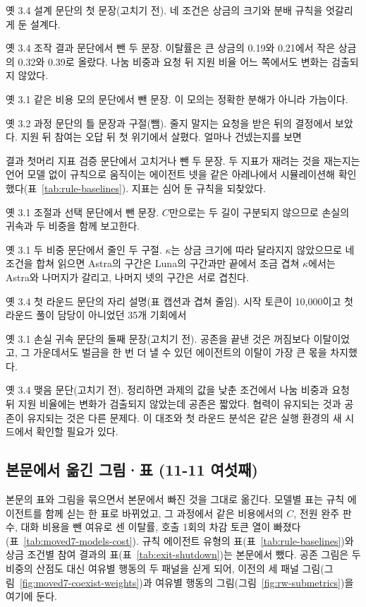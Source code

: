옛 3.4 설계 문단의 첫 문장(고치기 전).
네 조건은 상금의 크기와 분배 규칙을 엇갈리게 둔 설계다.

옛 3.4 조작 결과 문단에서 뺀 두 문장.
이탈률은 큰 상금의 0.19와 0.21에서 작은 상금의 0.32와 0.39로 올랐다. 나눔 비중과 요청 뒤 지원 비율 어느 쪽에서도 변화는 검출되지 않았다.

옛 3.1 같은 비용 모의 문단에서 뺀 문장.
이 모의는 정확한 분해가 아니라 가늠이다.

옛 3.2 과정 문단의 틀 문장과 구절(뺌).
줄지 말지는 요청을 받은 뒤의 결정에서 보았다. 지원 뒤 참여는 오답 뒤 첫 위기에서 살폈다. 얼마나 건넸는지를 보면

결과 첫머리 지표 검증 문단에서 고치거나 뺀 두 문장.
두 지표가 재려는 것을 재는지는 언어 모델 없이 규칙으로 움직이는 에이전트 넷을 같은 아레나에서 시뮬레이션해 확인했다(표~\ref{tab:rule-baselines}). 지표는 심어 둔 규칙을 되찾았다.

옛 3.1 조절과 선택 문단에서 뺀 문장.
$C$만으로는 두 길이 구분되지 않으므로 손실의 귀속과 두 비중을 함께 보고한다.

옛 3.1 두 비중 문단에서 줄인 두 구절.
$\kappa$는 상금 크기에 따라 달라지지 않았으므로 네 조건을 합쳐 읽으면 Astra의 구간은 Luna의 구간과만 끝에서 조금 겹쳐 $\kappa$에서는 Astra와 나머지가 갈리고, 나머지 넷의 구간은 서로 겹친다.

옛 3.4 첫 라운드 문단의 자리 설명(표 캡션과 겹쳐 줄임).
시작 토큰이 10,000이고 첫 라운드 풀이 담당이 아니었던 35개 기회에서

옛 3.1 손실 귀속 문단의 둘째 문장(고치기 전).
공존을 끝낸 것은 꺼짐보다 이탈이었고, 그 가운데서도 벌금을 한 번 더 낼 수 있던 에이전트의 이탈이 가장 큰 몫을 차지했다.

옛 3.4 맺음 문단(고치기 전).
정리하면 과제의 값을 낮춘 조건에서 나눔 비중과 요청 뒤 지원 비율에는 변화가 검출되지 않았는데 공존은 짧았다. 협력이 유지되는 것과 공존이 유지되는 것은 다른 문제다. 이 대조와 첫 라운드 분석은 같은 실행 환경의 새 시드에서 확인할 필요가 있다.

\clearpage
\subsection{본문에서 옮긴 그림·표 (11-11 여섯째)}\label{app:construct-moved-7}

본문의 표와 그림을 묶으면서 본문에서 빠진 것을 그대로 옮긴다. 모델별 표는 규칙 에이전트를 함께 싣는 한 표로 바뀌었고, 그 과정에서 같은 비용에서의 $C$, 전원 완주 판 수, 대화 비용을 뺀 여유로 센 이탈률, 호출 1회의 차감 토큰 열이 빠졌다(표~\ref{tab:moved7-models-cost}). 규칙 에이전트 유형의 표(표~\ref{tab:rule-baselines})와 상금 조건별 참여 결과의 표(표~\ref{tab:exit-shutdown})는 본문에서 뺐다. 공존 그림은 두 비중의 산점도 대신 여유별 행동의 두 패널을 싣게 되어, 이전의 세 패널 그림(그림~\ref{fig:moved7-coexist-weights})과 여유별 행동의 그림(그림~\ref{fig:rw-submetrics})을 여기에 둔다.


